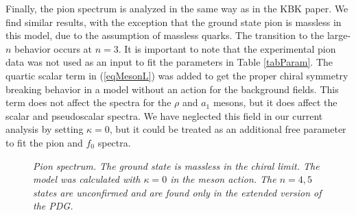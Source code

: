Finally, the pion spectrum is analyzed in the same way as in the KBK paper.
We find similar results, with the exception that the ground state pion is massless in this model, due to the assumption of massless quarks. 
The transition to the large-$n$ behavior occurs at $n=3$. 
It is important to note that the experimental pion data was not used as an input to fit the parameters in Table \ref{tabParam}.
The quartic scalar term in (\ref{eqMesonL}) was added to get the proper chiral symmetry breaking behavior in a model without an action for the background fields.
This term does not affect the spectra for the $\rho$ and $a_1$ mesons, but it does affect the scalar and pseudoscalar spectra.
We have neglected this field in our current analysis by setting $\kappa = 0$, but it could be treated as an additional free parameter to fit the pion and $f_0$ spectra.

\begin{figure}[htb]
\caption{\textit{Pion spectrum. The ground state is massless in the chiral limit. The model was calculated with $\kappa=0$ in the meson action. The $n=4,5$ states are unconfirmed and are found only in the extended version of the PDG.}}
\end{figure}



